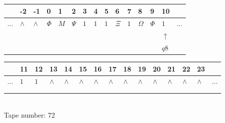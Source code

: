 \documentclass[11pt]{article}
\begin{document}
\begin{table}[H]
\centering
\begin{tabular}{lllllllllllllll}
 & -2 & -1 & 0 & 1 & 2 & 3 & 4 & 5 & 6 & 7 & 8 & 9 & 10 & \\
\hline
$...$ & \multicolumn{1}{|l|}{$\wedge$} & \multicolumn{1}{|l|}{$\wedge$} & \multicolumn{1}{|l|}{$\Phi$} & \multicolumn{1}{|l|}{$M$} & \multicolumn{1}{|l|}{$\Psi$} & \multicolumn{1}{|l|}{$1$} & \multicolumn{1}{|l|}{$1$} & \multicolumn{1}{|l|}{$1$} & \multicolumn{1}{|l|}{$\Xi$} & \multicolumn{1}{|l|}{$1$} & \multicolumn{1}{|l|}{$\Omega$} & \multicolumn{1}{|l|}{$\Phi$} & \multicolumn{1}{|l|}{$1$} & $...$\\
\hline
&  &  &  &  &  &  &  &  &  &  &  &  & $\uparrow$ &  \\
&  &  &  &  &  &  &  &  &  &  &  &  & $ q8 $ &  \\
\end{tabular}
\begin{tabular}{lllllllllllllll}
 & 11 & 12 & 13 & 14 & 15 & 16 & 17 & 18 & 19 & 20 & 21 & 22 & 23 & \\
\hline
$...$ & \multicolumn{1}{|l|}{$1$} & \multicolumn{1}{|l|}{$1$} & \multicolumn{1}{|l|}{$\wedge$} & \multicolumn{1}{|l|}{$\wedge$} & \multicolumn{1}{|l|}{$\wedge$} & \multicolumn{1}{|l|}{$\wedge$} & \multicolumn{1}{|l|}{$\wedge$} & \multicolumn{1}{|l|}{$\wedge$} & \multicolumn{1}{|l|}{$\wedge$} & \multicolumn{1}{|l|}{$\wedge$} & \multicolumn{1}{|l|}{$\wedge$} & \multicolumn{1}{|l|}{$\wedge$} & \multicolumn{1}{|l|}{$\wedge$} & $...$\\
\hline
&  &  &  &  &  &  &  &  &  &  &  &  &  &  \\
&  &  &  &  &  &  &  &  &  &  &  &  &  &  \\
\end{tabular}
\\
Tape number: 72
\noindent\makebox[\linewidth]{\hdashrule{\textwidth}{1pt}{1pt}}\end{table}
\end{document}

